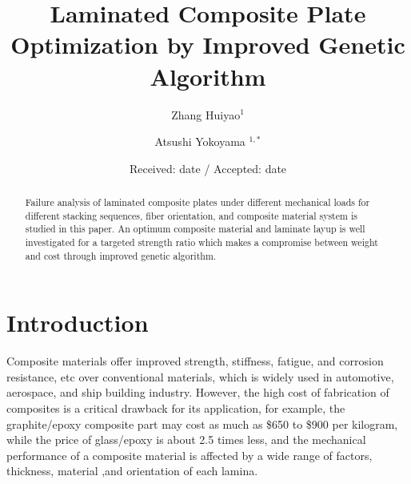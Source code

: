 \documentclass[smallextended]{svjour3}       %
\begin{document}
\title{Laminated Composite Plate Optimization by Improved Genetic Algorithm}
\author{Zhang Huiyao$^1$  \and
	Atsushi Yokoyama $^{1,*}$
}
\date{Received: date / Accepted: date}
\maketitle

\begin{abstract}
Failure analysis of laminated composite plates under different mechanical loads for different
stacking sequences, fiber orientation, and composite material system is studied in this paper.
An optimum composite material and laminate layup is well investigated for a targeted strength ratio which
makes a compromise between weight and cost through improved genetic algorithm.


\end{abstract}



\section{Introduction}
Composite materials offer improved strength, stiffness, fatigue, and corrosion
resistance, etc over conventional materials, which is widely used in
automotive, aerospace, and ship building industry.  However, the high cost of
fabrication of composites is a critical drawback for its application, for
example, the graphite/epoxy composite part may cost as much as \$650 to \$900
per kilogram, while the price of glass/epoxy is about 2.5 times less, and  the
mechanical performance of a composite material is affected by a wide range of factors,
thickness, material ,and orientation of each lamina.
\end{document}
